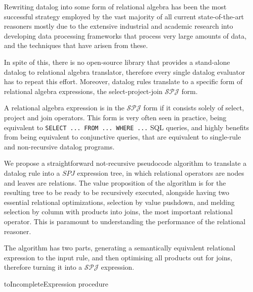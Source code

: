 \documentclass[manuscript,screen,review]{acmart}
\theoremstyle{definition}
\begin{document}
Rewriting datalog into some form of relational algebra has been the most successful strategy employed by the vast majority of all current state-of-the-art
reasoners\cite{bigdatalog, cog, nexus, recstep, dcdatalog, souffle} mostly due to the extensive industrial and academic research into developing data processing frameworks that
process very large amounts of data, and the techniques that have arisen from these.

In spite of this, there is no open-source library that provides a stand-alone datalog to relational algebra translator, therefore every single
datalog evaluator has to repeat this effort. Moreover, datalog rules translate to a specific form of relational algebra expressions, the
select-project-join $\mathcal{SPJ}$ form.

A relational algebra expression is in the $\mathcal{SPJ}$ form if it consists solely of select, project and join operators. This form
is very often seen in practice, being equivalent to \verb|SELECT ... FROM ... WHERE ...| SQL queries, and highly benefits from being
equivalent to conjunctive queries, that are equivalent to single-rule and non-recursive datalog programs.

We propose a straightforward not-recursive pseudocode algorithm to translate a datalog rule into a $SPJ$ expression tree, in which
relational operators are nodes and leaves are relations. The value proposition of the algorithm is for the resulting tree to be ready
to be recursively executed, alongside having two essential relational optimizations, selection by value pushdown, and melding selection
by column with products into joins, the most important relational operator. This is paramount to understanding the performance of the relational reasoner.

The algorithm has two parts, generating a semantically equivalent relational expression to the input rule, and then optimising all products out for joins, therefore turning it into a $\mathcal{SPJ}$ expression.

\begin{algorithm}
	\scriptsize
	\BlankLine

	\caption{toIncompleteExpression procedure}
	\label{alg:to_incomplete_expression}
\end{algorithm}
\end{document}
